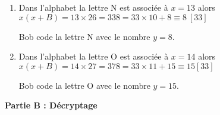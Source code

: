 \documentclass[11pt,a4paper,answers,fancyhdr]{exam}
\newcommand{\x}{\times}
\begin{document}
\begin{enumerate}
\item %

\begin{solution}

Dans l'alphabet la lettre \og N \fg{} est associée à $x=13$ alors $x(x+B) = 13\x26 = 338 = 33 \x  10 + 8 \equiv 8\: [33]$

Bob code la lettre \og N \fg{} avec le nombre $y = 8$.
\end{solution}

\item %
\begin{solution}

Dans l'alphabet la lettre \og O \fg{} est associée à $x = 14$ alors $x(x + B) = 14\x27=378 = 33\x11 + 15 \equiv 15 [33]$

Bob code la lettre \og O \fg{} avec le nombre $y=15$.
\end{solution}
\end{enumerate}

\bigskip

\textbf{Partie B : Décryptage}

\medskip




\end{document}
